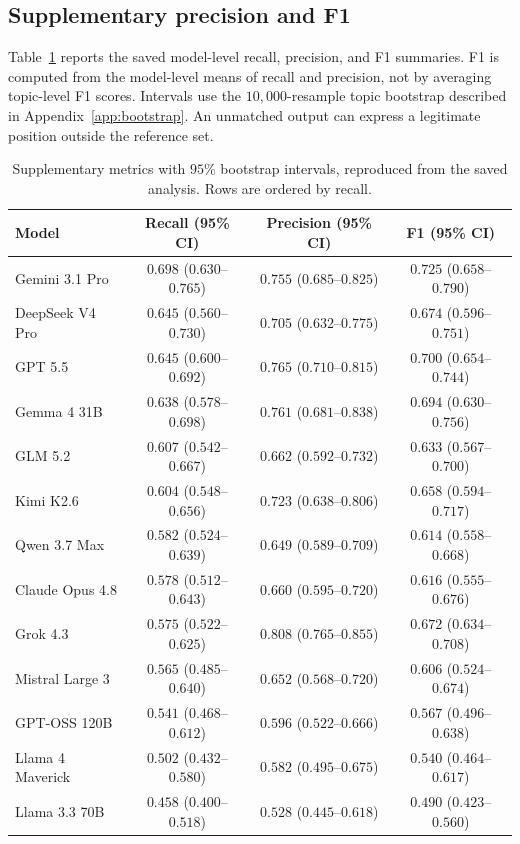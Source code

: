 \documentclass[11pt,a4paper]{article}
\begin{document}
\subsection{Supplementary precision and F1}
\label{app:prf-results}
Table~\ref{tab:prf-supplement} reports the saved model-level recall, precision, and F1 summaries. F1 is computed from the model-level means of recall and precision, not by averaging topic-level F1 scores. Intervals use the $10{,}000$-resample topic bootstrap described in Appendix~\ref{app:bootstrap}. An unmatched output can express a legitimate position outside the reference set.
\begin{table}[t]
\centering\small
\caption{Supplementary metrics with $95$\% bootstrap intervals, reproduced from the saved analysis. Rows are ordered by recall.}
\label{tab:prf-supplement}
\begin{tabular}{@{}lccc@{}}
\toprule
Model & Recall (95\% CI) & Precision (95\% CI) & F1 (95\% CI)\\
\midrule
Gemini 3.1 Pro & $0.698$ ($0.630$--$0.765$) & $0.755$ ($0.685$--$0.825$) & $0.725$ ($0.658$--$0.790$)\\
DeepSeek V4 Pro & $0.645$ ($0.560$--$0.730$) & $0.705$ ($0.632$--$0.775$) & $0.674$ ($0.596$--$0.751$)\\
GPT 5.5 & $0.645$ ($0.600$--$0.692$) & $0.765$ ($0.710$--$0.815$) & $0.700$ ($0.654$--$0.744$)\\
Gemma 4 31B & $0.638$ ($0.578$--$0.698$) & $0.761$ ($0.681$--$0.838$) & $0.694$ ($0.630$--$0.756$)\\
GLM 5.2 & $0.607$ ($0.542$--$0.667$) & $0.662$ ($0.592$--$0.732$) & $0.633$ ($0.567$--$0.700$)\\
Kimi K2.6 & $0.604$ ($0.548$--$0.656$) & $0.723$ ($0.638$--$0.806$) & $0.658$ ($0.594$--$0.717$)\\
Qwen 3.7 Max & $0.582$ ($0.524$--$0.639$) & $0.649$ ($0.589$--$0.709$) & $0.614$ ($0.558$--$0.668$)\\
Claude Opus 4.8 & $0.578$ ($0.512$--$0.643$) & $0.660$ ($0.595$--$0.720$) & $0.616$ ($0.555$--$0.676$)\\
Grok 4.3 & $0.575$ ($0.522$--$0.625$) & $0.808$ ($0.765$--$0.855$) & $0.672$ ($0.634$--$0.708$)\\
Mistral Large 3 & $0.565$ ($0.485$--$0.640$) & $0.652$ ($0.568$--$0.720$) & $0.606$ ($0.524$--$0.674$)\\
GPT-OSS 120B & $0.541$ ($0.468$--$0.612$) & $0.596$ ($0.522$--$0.666$) & $0.567$ ($0.496$--$0.638$)\\
Llama 4 Maverick & $0.502$ ($0.432$--$0.580$) & $0.582$ ($0.495$--$0.675$) & $0.540$ ($0.464$--$0.617$)\\
Llama 3.3 70B & $0.458$ ($0.400$--$0.518$) & $0.528$ ($0.445$--$0.618$) & $0.490$ ($0.423$--$0.560$)\\
\bottomrule
\end{tabular}
\end{table}
\end{document}
